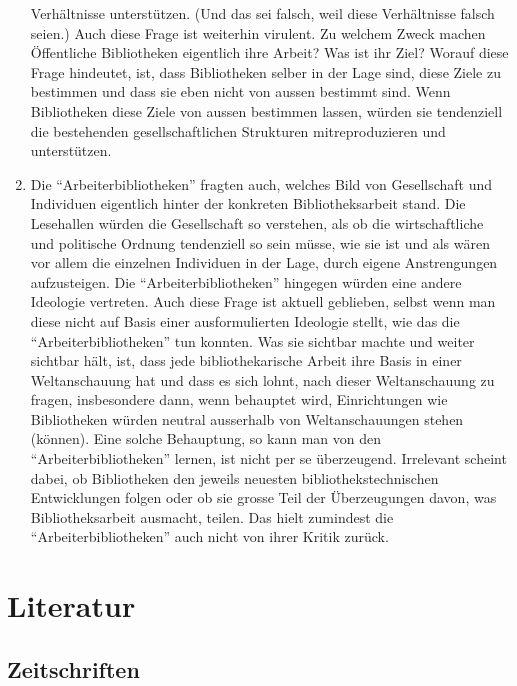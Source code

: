 \documentclass[a4paper,
fontsize=11pt,
oneside,
numbers=noperiodatend,
parskip=half-,
bibliography=totoc,
final
]{scrartcl}
\begin{document}
\begin{enumerate}
  Verhältnisse unterstützen. (Und das sei falsch, weil diese
  Verhältnisse falsch seien.) Auch diese Frage ist weiterhin virulent.
  Zu welchem Zweck machen Öffentliche Bibliotheken eigentlich ihre
  Arbeit? Was ist ihr Ziel? Worauf diese Frage hindeutet, ist, dass
  Bibliotheken selber in der Lage sind, diese Ziele zu bestimmen und
  dass sie eben nicht von aussen bestimmt sind. Wenn Bibliotheken diese
  Ziele von aussen bestimmen lassen, würden sie tendenziell die
  bestehenden gesellschaftlichen Strukturen mitreproduzieren und
  unterstützen.
\item
  Die \enquote{Arbeiterbibliotheken} fragten auch, welches Bild von
  Gesellschaft und Individuen eigentlich hinter der konkreten
  Bibliotheksarbeit stand. Die Lesehallen würden die Gesellschaft so
  verstehen, als ob die wirtschaftliche und politische Ordnung
  tendenziell so sein müsse, wie sie ist und als wären vor allem die
  einzelnen Individuen in der Lage, durch eigene Anstrengungen
  aufzusteigen. Die \enquote{Arbeiterbibliotheken} hingegen würden eine
  andere Ideologie vertreten. Auch diese Frage ist aktuell geblieben,
  selbst wenn man diese nicht auf Basis einer ausformulierten Ideologie
  stellt, wie das die \enquote{Arbeiterbibliotheken} tun konnten. Was
  sie sichtbar machte und weiter sichtbar hält, ist, dass jede
  bibliothekarische Arbeit ihre Basis in einer Weltanschauung hat und
  dass es sich lohnt, nach dieser Weltanschauung zu fragen, insbesondere
  dann, wenn behauptet wird, Einrichtungen wie Bibliotheken würden
  neutral ausserhalb von Weltanschauungen stehen (können). Eine solche
  Behauptung, so kann man von den \enquote{Arbeiterbibliotheken} lernen,
  ist nicht per se überzeugend. Irrelevant scheint dabei, ob
  Bibliotheken den jeweils neuesten bibliothekstechnischen Entwicklungen
  folgen oder ob sie grosse Teil der Überzeugungen davon, was
  Bibliotheksarbeit ausmacht, teilen. Das hielt zumindest die
  \enquote{Arbeiterbibliotheken} auch nicht von ihrer Kritik zurück.
\end{enumerate}

\hypertarget{literatur}{%
\section*{Literatur}\label{literatur}}

\hypertarget{zeitschriften}{%
\subsection*{Zeitschriften}\label{zeitschriften}}
\end{document}
